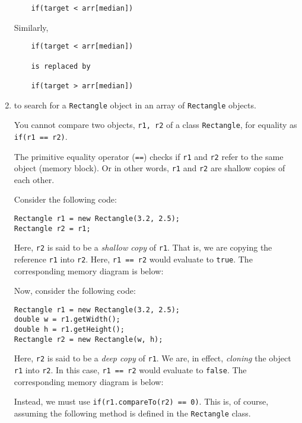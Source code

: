 \begin{questions}
\begin{enumerate}
\begin{solution}
\begin{verbatim}
	if(target < arr[median])
\end{verbatim}	

Similarly, 

\begin{verbatim}
	if(target < arr[median])
	
	is replaced by 
	
	if(target > arr[median])
\end{verbatim}
\end{solution}

\item to search for a \texttt{Rectangle} object in an array of \texttt{Rectangle} objects. 

You cannot compare two objects, \texttt{r1, r2} of a class \texttt{Rectangle}, for equality as \texttt{if(r1 == r2)}. 

The primitive equality operator (\texttt{==}) checks if \texttt{r1} and \texttt{r2} refer to the same object (memory block). Or in other words, \texttt{r1} and \texttt{r2} are shallow copies of each other.

Consider the following code:

\vskip 0.5cm
\begin{lstlisting}
Rectangle r1 = new Rectangle(3.2, 2.5);
Rectangle r2 = r1;
\end{lstlisting}
\vskip 0.5cm
Here, \texttt{r2} is said to be a \emph{shallow copy} of \texttt{r1}. That is, we are copying the reference \texttt{r1} into \texttt{r2}. Here, \texttt{r1 == r2} would evaluate to \texttt{true}. The corresponding memory diagram is below:
\vskip 0.5cm
\vskip 0.5cm
Now, consider the following code:
\vskip 0.5cm
\begin{lstlisting}
Rectangle r1 = new Rectangle(3.2, 2.5);
double w = r1.getWidth();
double h = r1.getHeight();
Rectangle r2 = new Rectangle(w, h);
\end{lstlisting}
\vskip 0.5cm
Here, \texttt{r2} is said to be a \emph{deep copy} of \texttt{r1}. We are, in effect, \emph{cloning} the object \texttt{r1} into \texttt{r2}. In this case, \texttt{r1 == r2} would evaluate to \texttt{false}. The corresponding memory diagram is below:
\vskip 0.5cm
\vskip 0.5cm
Instead, we must use \texttt{if(r1.compareTo(r2) == 0)}. This is, of course, assuming the following method is defined in the \texttt{Rectangle} class. 


\end{enumerate}
\end{questions}
